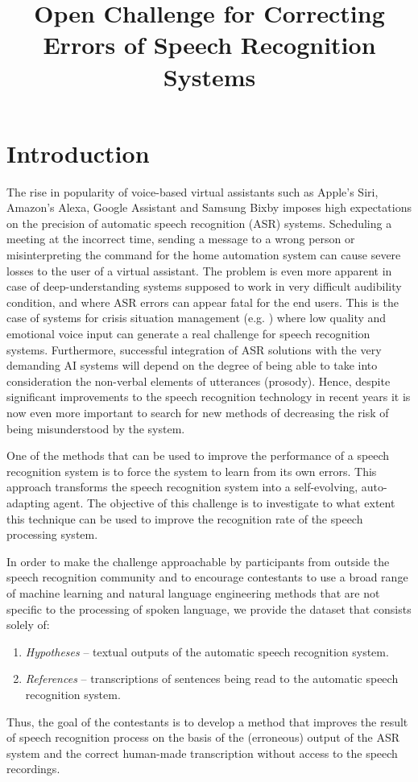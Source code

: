 \documentclass[10pt, a4paper]{article}
\title{Open Challenge for Correcting Errors of Speech Recognition Systems} %
\begin{document}
\maketitleabstract

\section{Introduction}

The rise in popularity of voice-based virtual assistants such as Apple's Siri, Amazon's Alexa, Google
Assistant and Samsung Bixby imposes high expectations on the precision of automatic speech
recognition (ASR) systems. 
Scheduling a meeting at the incorrect time, sending a message to a wrong person or
misinterpreting the command for the home automation system can cause severe losses to the
user of a virtual assistant.
The problem is even more apparent in case of deep-understanding systems
supposed to work in very difficult audibility condition, and where ASR errors can appear fatal 
for the end users. This is the case of systems for crisis situation management
(e.g. ) where low quality
and emotional voice input can generate a real challenge for speech recognition systems.
Furthermore, successful 
integration of ASR solutions with the very demanding AI systems will depend on the degree
of being able to take into consideration the non-verbal elements of utterances (prosody). 
Hence, despite significant improvements to the speech recognition
technology in recent years it is now even more important to search for new methods of
decreasing the risk of being misunderstood by the system.

One of the methods that can be used to improve the performance of a speech recognition system is to 
force the system to learn from its own errors. This approach transforms the speech recognition system
into a self-evolving, auto-adapting agent.
The objective of this challenge is to investigate to what extent this technique can be used to improve the
recognition rate of the speech processing system.

In order to make the challenge approachable by participants from outside the speech recognition
community and to encourage contestants to use a broad range of machine learning and natural
language engineering
methods that are not specific to the processing of spoken language, we provide the dataset
that consists solely of:

\begin{enumerate}
  \item \emph{Hypotheses} -- textual outputs of the automatic speech recognition system.
  \item \emph{References} -- transcriptions of sentences being read to the automatic speech recognition system.
\end{enumerate}
%
Thus, the goal of the contestants is to develop a method that improves the result of
speech recognition process on the basis of the (erroneous)
output of the ASR system and the correct human-made transcription without access to the speech
recordings.
\end{document}
